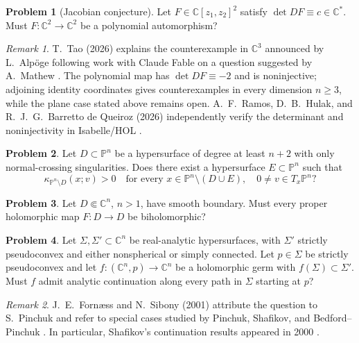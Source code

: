 \documentclass[11pt,reqno]{amsart}
\theoremstyle{definition}
\newtheorem{problem}{Problem}[section]
\theoremstyle{remark}
\newtheorem*{remark}{Remark}
\begin{document}
\begin{problem}[Jacobian conjecture]\label{b95-9-2-1}\label{FS-3.21}
Let $F\in\mathbb C[z_1,z_2]^2$ satisfy $\det DF\equiv c\in\mathbb C^*$. Must $F:\mathbb C^2\to\mathbb C^2$ be a polynomial automorphism?
\end{problem}
\begin{remark}
T.~Tao (2026) explains the counterexample in $\mathbb C^3$ announced by L.~Alp\"oge following work with Claude Fable on a question suggested by A.~Mathew \cite{SM-TaoJac26,SM-AFPJac26}. The polynomial map has $\det DF\equiv-2$ and is noninjective; adjoining identity coordinates gives counterexamples in every dimension $n\geq3$, while the plane case stated above remains open. A.~F.~Ramos, D.~B.~Hulak, and R.~J.~G.~Barretto de Queiroz (2026) independently verify the determinant and noninjectivity in Isabelle/HOL \cite{SM-AFPJac26}.
\end{remark}

\begin{problem}\label{b95-7-5-4}
Let $D\subset\mathbb P^n$ be a hypersurface of degree at least $n+2$ with only normal-crossing singularities. Does there exist a hypersurface $E\subset\mathbb P^n$ such that
\[
 \kappa_{\mathbb P^n\setminus D}(x;v)>0
 \quad\text{for every }x\in\mathbb P^n\setminus(D\cup E),\quad
 0\neq v\in T_x\mathbb P^n?
\]
\end{problem}

\begin{problem}\label{b95-9-3-2}
Let $D\Subset\mathbb C^n$, $n>1$, have smooth boundary. Must every proper holomorphic map $F:D\to D$ be biholomorphic?
\end{problem}

\begin{problem}\label{FS-3.18}
Let $\Sigma,\Sigma'\subset\mathbb C^n$ be real-analytic hypersurfaces, with $\Sigma'$ strictly pseudoconvex and either nonspherical or simply connected. Let $p\in\Sigma$ be strictly pseudoconvex and let $f:(\mathbb C^n,p)\to\mathbb C^n$ be a holomorphic germ with $f(\Sigma)\subset\Sigma'$. Must $f$ admit analytic continuation along every path in $\Sigma$ starting at $p$?
\end{problem}
\begin{remark}
J.~E.~Forn\ae ss and N.~Sibony (2001) attribute the question to S.~Pinchuk and refer to special cases studied by Pinchuk, Shafikov, and Bedford--Pinchuk \cite[Question~3.18]{FS2001}. In particular, Shafikov's continuation results appeared in 2000 \cite{FS-ShafikovCont}.
\end{remark}
\end{document}
